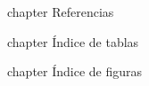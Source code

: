 \documentclass[a4paper,12pt,master]{iietesis}
\begin{document}


\appendix


\backmatter


\newpage{} {chapter} {Referencias}




\newpage{} {chapter} {\'Indice de tablas}%
\listoftables %

\newpage\newpage{} {chapter} {\'Indice de figuras}%
\listoffigures %




\lastpage
\end{document}
